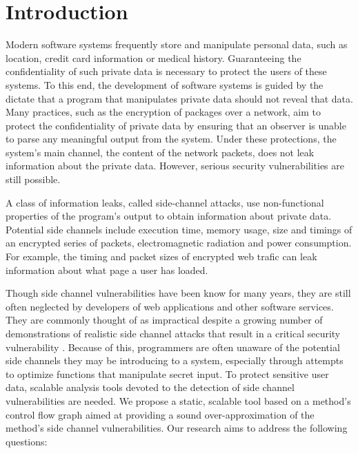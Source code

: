\section{Introduction}

Modern software systems frequently store and manipulate personal data, such as location, credit card information or medical history.  Guaranteeing the confidentiality of such private data is necessary to protect the users of these systems.  To this end, the development of software systems is guided by the dictate that a program that manipulates private data should not reveal that data.  Many practices, such as the encryption of packages over a network, aim to protect the confidentiality of private data by ensuring that an observer is unable to parse any meaningful output from the system. Under these protections, the system's main channel, the content of the network packets, does not leak information about the private data. However, serious security vulnerabilities are still possible. 

A class of information leaks, called side-channel attacks, use non-functional properties of the program's output to obtain information about private data.  Potential side channels include execution time, memory usage, size and timings of an encrypted series of packets, electromagnetic radiation and power consumption. For example, the timing and packet sizes of encrypted web trafic can leak information about what page a user has loaded. %

Though side channel vulnerabilities have been know for many years, they are still often neglected by developers of web applications and other software services. They are commonly thought of as impractical despite a growing number of demonstrations of realistic side channel attacks that result in a critical security vulnerability \cite{timingpractical, cachepractical, ASLRtiming}. Because of this, programmers are often unaware of the potential side channels they may be introducing to a system, especially through attempts to optimize functions that manipulate secret input. To protect sensitive user data, scalable analysis tools devoted to the detection of side channel vulnerabilities are needed. We propose a static, scalable tool based on a method's control flow graph aimed at providing a sound over-approximation of the method's side channel vulnerabilities.  Our research aims to address the following questions:


